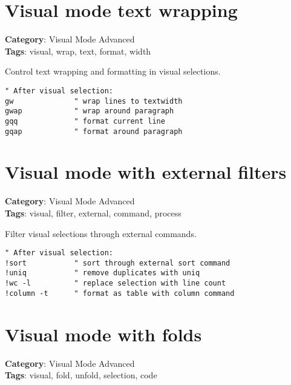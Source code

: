 {{{{{{{{{{{{{{{{{{\section{Visual mode text wrapping}

\textbf{Category}: Visual Mode Advanced\\ \textbf{Tags}: visual, wrap, text, format, width
\vspace{0.5cm}

Control text wrapping and formatting in visual selections.

\begin{Exa*}{}
\begin{Verbatim}[fontsize=\footnotesize, breaklines, breakanywhere]
" After visual selection:
gw              " wrap lines to textwidth  
gwap            " wrap around paragraph
gqq             " format current line
gqap            " format around paragraph
\end{Verbatim}
\end{Exa*}

\section{Visual mode with external filters}

\textbf{Category}: Visual Mode Advanced\\ \textbf{Tags}: visual, filter, external, command, process
\vspace{0.5cm}

Filter visual selections through external commands.

\begin{Exa*}{}
\begin{Verbatim}[fontsize=\footnotesize, breaklines, breakanywhere]
" After visual selection:
!sort           " sort through external sort command
!uniq           " remove duplicates with uniq
!wc -l          " replace selection with line count
!column -t      " format as table with column command
\end{Verbatim}
\end{Exa*}

\section{Visual mode with folds}

\textbf{Category}: Visual Mode Advanced\\ \textbf{Tags}: visual, fold, unfold, selection, code
\vspace{0.5cm}

}}}}}}}}}}}}}}}}}}
